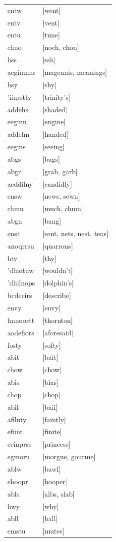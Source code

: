 \documentclass{article}
\begin{document}
\begin{tabular}{ll}
entw & [went] \\
entv & [vent] \\
entu & [tune] \\
chno & [noch, chon] \\
hss & [ssh] \\
aegimnns & [magennis, meanings] \\
hsy & [shy] \\
'iinrstty & [trinity's] \\
addehs & [shaded] \\
eeginn & [engine] \\
addehn & [handed] \\
eegins & [seeing] \\
abgs & [bags] \\
abgr & [grab, garb] \\
acddilny & [candidly] \\
ensw & [news, sewn] \\
chmu & [much, chum] \\
abgn & [bang] \\
enst & [sent, nets, nest, tens] \\
anoqrrsu & [quarrons] \\
hty & [thy] \\
'dlnotuw & [wouldn't] \\
'dhilnops & [dolphin's] \\
bcdeeirs & [describe] \\
envy & [envy] \\
hnnoortt & [thornton] \\
aadefiors & [aforesaid] \\
fosty & [softy] \\
abit & [bait] \\
chow & [chow] \\
abis & [bias] \\
chop & [chop] \\
abil & [bail] \\
afilnty & [faintly] \\
efiint & [finite] \\
ceinprss & [princess] \\
egmoru & [morgue, gourme] \\
ablw & [bawl] \\
ehoopr & [hooper] \\
abls & [albs, slab] \\
hwy & [why] \\
abll & [ball] \\
emstu & [mutes] \\

\end{tabular}
\end{document}
